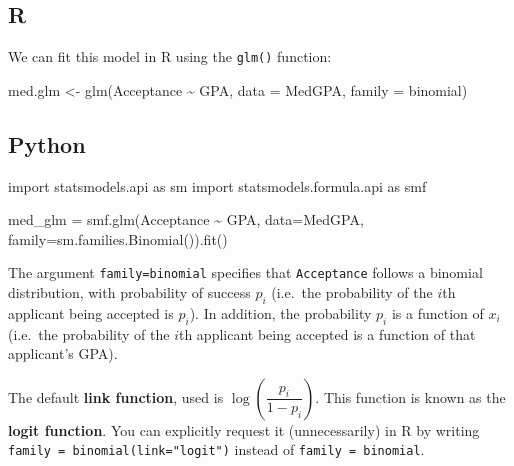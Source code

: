 \documentclass[
  a4paper,
  DIV=11,
  numbers=noendperiod]{scrreprt}
\newenvironment{Shaded}{\begin{snugshade}}{\end{snugshade}}
\newcommand{\AttributeTok}[1]{\textcolor[rgb]{0.40,0.45,0.13}{#1}}
\newcommand{\FunctionTok}[1]{\textcolor[rgb]{0.28,0.35,0.67}{#1}}
\newcommand{\ImportTok}[1]{\textcolor[rgb]{0.00,0.46,0.62}{#1}}
\newcommand{\NormalTok}[1]{\textcolor[rgb]{0.00,0.23,0.31}{#1}}
\newcommand{\OperatorTok}[1]{\textcolor[rgb]{0.37,0.37,0.37}{#1}}
\newcommand{\OtherTok}[1]{\textcolor[rgb]{0.00,0.23,0.31}{#1}}
\newcommand{\SpecialCharTok}[1]{\textcolor[rgb]{0.37,0.37,0.37}{#1}}
\newcommand{\StringTok}[1]{\textcolor[rgb]{0.13,0.47,0.30}{#1}}
\newcommand{\term}[1]{\textbf{#1}}
\newenvironment{fbxSimple}[3]{\begin{tcolorbox}[enhanced, breakable,%
attach boxed title to top*={xshift=1.4pt},
boxed title style={boxrule=0.0mm, fuzzy shadow={1pt}{-1pt}{0mm}{0.1mm}{gray}, arc=.3em, rounded corners=east, sharp corners=west}, colframe=#1-color2, colbacktitle=#1-color1, colback = white, coltitle=black,  titlerule=0mm, toprule=0pt, bottomrule=.7pt, leftrule=.3em, rightrule=.7pt, outer arc=.3em,  	left=.5em, right=.5em, bottomtitle=1mm, toptitle=1mm,title=\textbf{#2}\hspace{0.5em}{#3}]}
{\end{tcolorbox}}
\begin{document}
\label{Example-3}
\begin{fbxSimple}{Example}{Example 3}{}
\label{Example-3}

\subsection{R}

We can fit this model in R using the \texttt{glm()} function:

\begin{Shaded}
\begin{Highlighting}[]
\NormalTok{med.glm }\OtherTok{\textless{}{-}} \FunctionTok{glm}\NormalTok{(Acceptance }\SpecialCharTok{\textasciitilde{}}\NormalTok{ GPA, }\AttributeTok{data =}\NormalTok{ MedGPA, }\AttributeTok{family =}\NormalTok{ binomial)}
\end{Highlighting}
\end{Shaded}

\subsection{Python}

\begin{Shaded}
\begin{Highlighting}[]
\ImportTok{import}\NormalTok{ statsmodels.api }\ImportTok{as}\NormalTok{ sm}
\ImportTok{import}\NormalTok{ statsmodels.formula.api }\ImportTok{as}\NormalTok{ smf}

\NormalTok{med\_glm }\OperatorTok{=}\NormalTok{ smf.glm(}\StringTok{\textquotesingle{}Acceptance \textasciitilde{} GPA\textquotesingle{}}\NormalTok{, data}\OperatorTok{=}\NormalTok{MedGPA, family}\OperatorTok{=}\NormalTok{sm.families.Binomial()).fit()}
\end{Highlighting}
\end{Shaded}

The argument \texttt{family=binomial} specifies that \texttt{Acceptance}
follows a binomial distribution, with probability of success \(p_i\)
(i.e.~the probability of the \(i\)th applicant being accepted is
\(p_i\)). In addition, the probability \(p_i\) is a function of \(x_i\)
(i.e.~the probability of the \(i\)th applicant being accepted is a
function of that applicant's GPA).

The default \term{link function}, used is
\(\log\left(\dfrac{p_i}{1-p_i}\right)\). This function is known as the
\term{logit function}. You can explicitly request it (unnecessarily) in
R by writing \texttt{family\ =\ binomial(link="logit")} instead of
\texttt{family\ =\ binomial}.


\end{fbxSimple}
\end{document}
